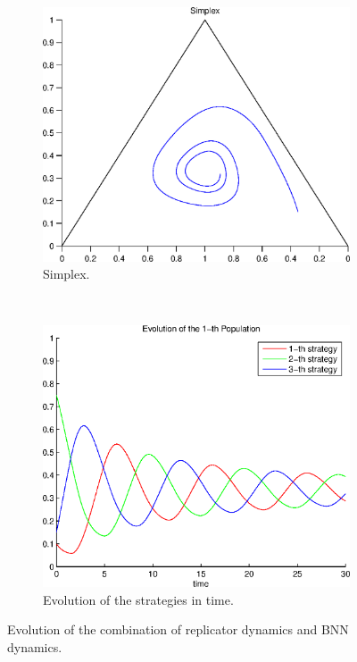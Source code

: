 \begin{figure}[h]
  \centering
  \begin{subfigure}[b]{0.4\textwidth}
	  \includegraphics[width=\textwidth]{./images/test_combined.eps}
	  \caption{Simplex.}
	  \label{fig:test_combined_simplex}
  \end{subfigure}
  ~ 
  \begin{subfigure}[b]{0.45\textwidth}
	  \includegraphics[width=\textwidth]{./images/test_combined_ev.eps}
	  \caption{Evolution of the strategies in time.}
	  \label{fig:test_combined_ev}
  \end{subfigure}
  \caption{Evolution of the combination of replicator dynamics and BNN dynamics.}
  \label{fig:rps_combined}
\end{figure}




